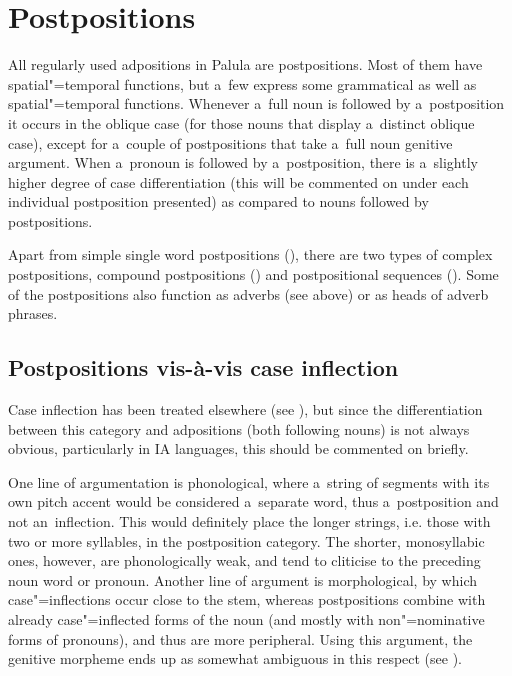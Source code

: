 \section{Postpositions}
\label{sec:7-2}

All regularly used adpositions in Palula are postpositions. Most of them have spatial"=temporal functions, but a~few express some grammatical as well as spatial"=temporal functions. Whenever a~full noun is followed by a~postposition it occurs in the oblique case (for those nouns that display a~distinct oblique case), except for a~couple of postpositions that take a~full noun genitive argument. When a~pronoun is followed by a~postposition, there is a~slightly higher degree of case differentiation (this will be commented on under each individual postposition presented) as compared to nouns followed by postpositions.


Apart from simple single word postpositions (), there are two types of complex postpositions, compound postpositions () and postpositional sequences (). Some of the postpositions also function as adverbs (see above) or as heads of adverb phrases. 


\subsection{Postpositions vis-à-vis case inflection}
\label{subsec:7-2-1}


Case inflection has been treated elsewhere (see ), but since the differentiation between this category and adpositions (both following nouns) is not always obvious, particularly in IA languages, this should be commented on briefly. 


One line of argumentation is phonological, where a~string of segments with its own pitch accent would be considered a~separate word, thus a~postposition and not an~inflection. This would definitely place the longer strings, i.e. those with two or more syllables, in the postposition category. The shorter, monosyllabic ones, however, are phonologically weak, and tend to cliticise to the preceding noun word or pronoun. Another line of argument is morphological, by which case"=inflections occur close to the stem, whereas postpositions combine with already case"=inflected forms of the noun (and mostly with non"=nominative forms of pronouns), and thus are more peripheral. Using this argument, the genitive morpheme ends up as somewhat ambiguous in this respect (see ).


